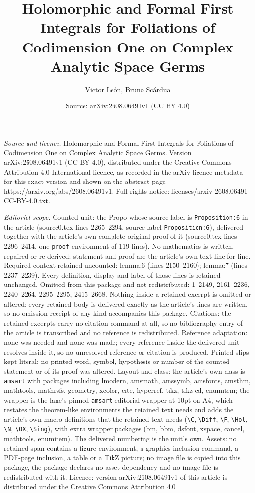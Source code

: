 \documentclass[10pt,a4paper]{amsart}
\title[Holomorphic and Formal First Integrals for Foliations of Cod]{Holomorphic and Formal First Integrals for Foliations of Codimension One on Complex Analytic Space Germs}
\author{Victor Le\'on, Bruno Sc\'ardua}
\date{Source: arXiv:2608.06491v1 (CC BY 4.0)}
\begin{document}
\maketitle

\noindent\emph{Source and licence.} Holomorphic and Formal First Integrals for Foliations of Codimension One on Complex Analytic Space Germs. Version arXiv:2608.06491v1 (CC BY 4.0), distributed under the Creative Commons Attribution 4.0 International licence, as recorded in the arXiv licence metadata for this exact version and shown on the abstract page https://arxiv.org/abs/2608.06491v1. Full rights notice: licenses/arxiv-2608.06491-CC-BY-4.0.txt.\par\smallskip

\noindent\textit{Editorial scope.} Counted unit: the Propo whose source label is \texttt{Proposition:6} in the article (source0.tex lines 2265--2294, source label \texttt{Proposition:6}), delivered together with the article's own complete original proof of it (source0.tex lines 2296--2414, one \texttt{proof} environment of 119 lines). No mathematics is written, repaired or re-derived: statement and proof are the article's own text line for line. Required context retained uncounted: lemma:6 (lines 2150--2160); lemma:7 (lines 2237--2239). Every definition, display and label of those lines is retained unchanged. Omitted from this package and not redistributed: 1--2149, 2161--2236, 2240--2264, 2295--2295, 2415--2668. Nothing inside a retained excerpt is omitted or altered: every retained body is delivered exactly as the article's lines are written, so no omission receipt of any kind accompanies this package. Citations: the retained excerpts carry no citation command at all, so no bibliography entry of the article is transcribed and no reference is redistributed. Reference adaptation: none was needed and none was made; every reference inside the delivered unit resolves inside it, so no unresolved reference or citation is produced. Printed slips kept literal: no printed word, symbol, hypothesis or number of the counted statement or of its proof was altered. Layout and class: the article's own class is \texttt{amsart} with packages including lmodern, amsmath, amssymb, amsfonts, amsthm, mathtools, mathrsfs, geometry, xcolor, cite, hyperref, tikz, tikz-cd, enumitem; the wrapper is the lane's pinned \texttt{amsart} editorial wrapper at 10pt on A4, which restates the theorem-like environments the retained text needs and adds the article's own macro definitions that the retained text needs (\texttt{\textbackslash C}, \texttt{\textbackslash Diff}, \texttt{\textbackslash F}, \texttt{\textbackslash Hol}, \texttt{\textbackslash N}, \texttt{\textbackslash OX}, \texttt{\textbackslash Sing}), with extra wrapper packages (bm, bbm, dsfont, xspace, cancel, mathtools, enumitem). The delivered numbering is the unit's own. Assets: no retained span contains a figure environment, a graphics-inclusion command, a PDF-page inclusion, a table or a TikZ picture; no image file is copied into this package, the package declares no asset dependency and no image file is redistributed with it. Licence: version arXiv:2608.06491v1 of this article is distributed under the Creative Commons Attribution 4.0 
\end{document}

